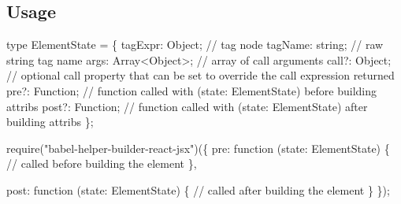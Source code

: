 \subsection*{Usage}


\begin{DoxyCode}
type ElementState = \{
  tagExpr: Object; // tag node
  tagName: string; // raw string tag name
  args: Array<Object>; // array of call arguments
  call?: Object; // optional call property that can be set to override the call expression returned
  pre?: Function; // function called with (state: ElementState) before building attribs
  post?: Function; // function called with (state: ElementState) after building attribs
\};

require("babel-helper-builder-react-jsx")(\{
  pre: function (state: ElementState) \{
    // called before building the element
  \},

  post: function (state: ElementState) \{
    // called after building the element
  \}
\});
\end{DoxyCode}
 